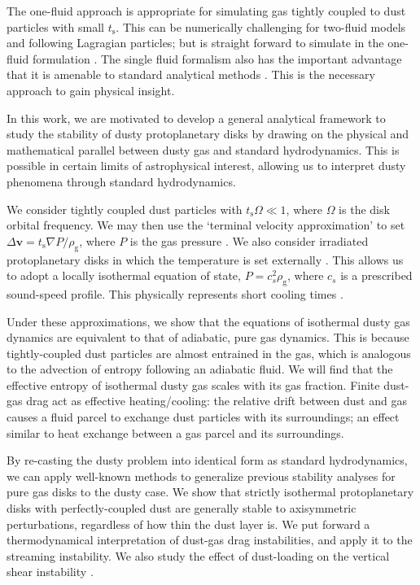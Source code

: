 \documentclass[iop, numberedappendix]{emulateapj}
\newcommand{\rhog}{\rho_\mathrm{g}}
\newcommand{\tstop}{t_\mathrm{s}}
\begin{document}
The one-fluid approach is appropriate for 
simulating gas tightly coupled to dust particles with small $\tstop$.  
This can be numerically challenging for two-fluid models and 
following Lagragian particles; but is straight forward to simulate in the 
one-fluid formulation \citep{price15}.  The single fluid formalism
also has the important advantage that it is 
amenable to standard analytical methods \citep{youdin05a,jacquet11}.  
This is the necessary approach to gain physical insight.  


In this work, we are motivated to develop a general analytical
framework to study the stability of dusty protoplanetary 
disks by drawing on the physical and mathematical parallel between
dusty gas and standard hydrodynamics. This is possible in certain limits of astrophysical
interest, allowing us to interpret dusty phenomena through standard
hydrodynamics.   

We consider tightly coupled dust particles with $\tstop\Omega\ll
1$, where $\Omega$ is the disk orbital frequency. We may then use the
`terminal velocity approximation' to set $\Delta \bm{v} = \tstop\nabla
P/\rhog$, where $P$ is the gas pressure \citep{youdin05a, 
  jacquet11,laibe14}. %
 We also consider irradiated protoplanetary disks 
in which the temperature is set externally
\citep{chiang97,stam08}. This allows us to adopt a locally isothermal
equation of state, $P = c_s^2\rhog$, where $c_s$ is a prescribed
sound-speed profile. This physically represents short cooling times
\citep{lin15}.   

Under these approximations, we show that the equations of 
isothermal dusty gas dynamics are equivalent to that of adiabatic, pure gas
dynamics. This is because tightly-coupled dust particles are almost
entrained in the gas, which is analogous to the advection
of entropy following an adiabatic fluid. We will find that the   
effective entropy of isothermal dusty gas scales with its gas
fraction. Finite dust-gas drag act as effective heating/cooling: the relative
drift between dust and gas causes a fluid parcel to exchange dust
particles with its surroundings; an effect similar to heat exchange
between a gas parcel and its surroundings.   


By re-casting the dusty problem into identical form as standard  
hydrodynamics, we can apply well-known methods to generalize previous stability 
analyses for pure gas disks to the dusty case. %
We show that strictly isothermal protoplanetary disks with
perfectly-coupled dust are generally 
stable to axisymmetric perturbations, regardless of how  thin the dust
layer is. We put forward a thermodynamical interpretation of
dust-gas drag instabilities, and apply it to the streaming instability.   
We also study the effect of dust-loading on the vertical shear
instability \citep[VSI,][]{nelson13,lin15,barker15}. 
\end{document}
